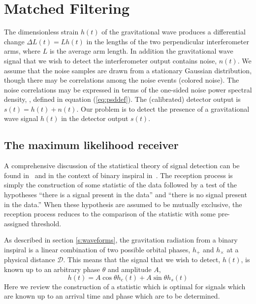 \section{Matched Filtering}
\label{s:matchedfilter}

The dimensionless strain $h(t)$ of the gravitational wave produces a
differential change $\Delta L(t)=L h(t)$ in the lengths of the two
perpendicular interferometer arms, where $L$ is the average arm length.  In
addition the gravitational wave signal that we wish to detect the
interferometer output contains noise, $n(t)$. We assume that the noise samples
are drawn from a stationary Gaussian distribution, though there may be
correlations among the noise events (colored noise). The noise correlations
may be expressed in terms of the one-sided noise power spectral density,
\ospsd, defined in equation (\ref{eq:psddef}). The (calibrated) detector
output is $s(t) = h(t) + n(t)$.  Our problem is to detect the presence of a
gravitational wave signal $h(t)$ in the detector output $s(t)$.

\subsection{The maximum likelihood receiver}
\label{ss:maxrec}

A comprehensive discussion of the statistical theory of signal detection can
be found in~\cite{wz} and in the context of binary inspiral
in~\cite{finn,finnchernoff}. The reception process is simply the construction
of some statistic of the data followed by a test of the hypotheses ``there is
a signal present in the data'' and ``there is no signal present in the data.''
When these hypothesis are assumed to be mutually exclusive, the reception
process reduces to the comparison of the statistic with some pre-assigned
threshold. 

As described in section \ref{s:waveforms}, the gravitation radiation from a
binary inspiral is a linear combination of two possible orbital phases,
$h_{+}$ and $h_{\times}$ at a physical distance $\mathcal{D}$. This means that
the signal that we wish to detect, $h(t)$, is known up to an arbitrary phase
$\theta$ and amplitude $A$,
\begin{equation}
h(t) = A \cos \theta h_c(t) + A \sin \theta h_s(t)
\end{equation}
Here we review the construction of a statistic which is optimal for
signals which are known up to an arrival time and phase which are to be
determined.


